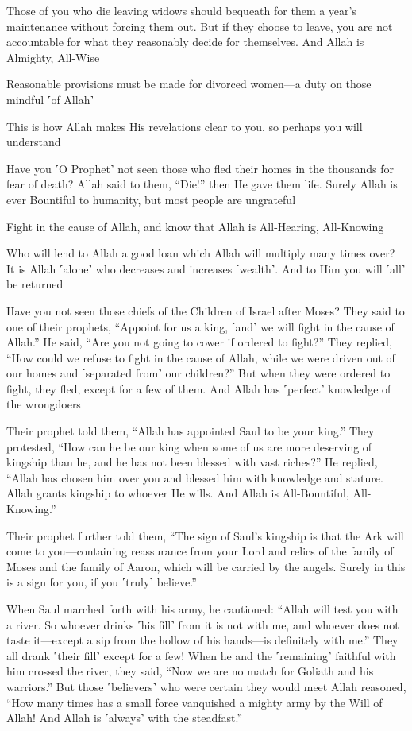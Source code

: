 Those of you who die leaving widows should bequeath for them a year’s maintenance without forcing them out. But if they choose to leave, you are not accountable for what they reasonably decide for themselves. And Allah is Almighty, All-Wise

Reasonable provisions must be made for divorced women—a duty on those mindful ˹of Allah˺

This is how Allah makes His revelations clear to you, so perhaps you will understand

Have you ˹O Prophet˺ not seen those who fled their homes in the thousands for fear of death? Allah said to them, “Die!” then He gave them life. Surely Allah is ever Bountiful to humanity, but most people are ungrateful

Fight in the cause of Allah, and know that Allah is All-Hearing, All-Knowing

Who will lend to Allah a good loan which Allah will multiply many times over? It is Allah ˹alone˺ who decreases and increases ˹wealth˺. And to Him you will ˹all˺ be returned

Have you not seen those chiefs of the Children of Israel after Moses? They said to one of their prophets, “Appoint for us a king, ˹and˺ we will fight in the cause of Allah.” He said, “Are you not going to cower if ordered to fight?” They replied, “How could we refuse to fight in the cause of Allah, while we were driven out of our homes and ˹separated from˺ our children?” But when they were ordered to fight, they fled, except for a few of them. And Allah has ˹perfect˺ knowledge of the wrongdoers

Their prophet told them, “Allah has appointed Saul to be your king.” They protested, “How can he be our king when some of us are more deserving of kingship than he, and he has not been blessed with vast riches?” He replied, “Allah has chosen him over you and blessed him with knowledge and stature. Allah grants kingship to whoever He wills. And Allah is All-Bountiful, All-Knowing.”

Their prophet further told them, “The sign of Saul’s kingship is that the Ark will come to you—containing reassurance from your Lord and relics of the family of Moses and the family of Aaron, which will be carried by the angels. Surely in this is a sign for you, if you ˹truly˺ believe.”

When Saul marched forth with his army, he cautioned: “Allah will test you with a river. So whoever drinks ˹his fill˺ from it is not with me, and whoever does not taste it—except a sip from the hollow of his hands—is definitely with me.” They all drank ˹their fill˺ except for a few! When he and the ˹remaining˺ faithful with him crossed the river, they said, “Now we are no match for Goliath and his warriors.” But those ˹believers˺ who were certain they would meet Allah reasoned, “How many times has a small force vanquished a mighty army by the Will of Allah! And Allah is ˹always˺ with the steadfast.”

